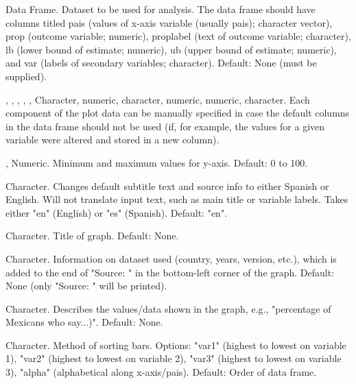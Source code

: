 \documentclass[a4paper]{book}
\begin{document}
\begin{Arguments}
\begin{ldescription}
\item[\code{data}] Data Frame. Dataset to be used for analysis.  The data frame should have columns
titled pais (values of x-axis variable (usually pais); character vector), prop (outcome variable; numeric),
proplabel (text of outcome variable; character), lb (lower bound of estimate; numeric),
ub (upper bound of estimate; numeric), and var (labels of secondary variables; character).
Default: None (must be supplied).

\item[\code{pais}, \code{outcome\_var}, \code{label\_var}, \code{lower\_bound}, \code{upper\_bound}, \code{var}] Character, numeric, character,
numeric, numeric, character. Each component of the plot data can be manually specified in case
the default columns in the data frame should not be used (if, for example, the values for a given
variable were altered and stored in a new column).

\item[\code{ymin}, \code{ymax}] Numeric.  Minimum and maximum values for y-axis. Default: 0 to 100.

\item[\code{lang}] Character.  Changes default subtitle text and source info to either Spanish or English.
Will not translate input text, such as main title or variable labels.  Takes either "en" (English)
or "es" (Spanish).  Default: "en".

\item[\code{main\_title}] Character.  Title of graph.  Default: None.

\item[\code{source\_info}] Character.  Information on dataset used (country, years, version, etc.),
which is added to the end of "Source: " in the bottom-left corner of the graph.
Default: None (only "Source: " will be printed).

\item[\code{subtitle}] Character.  Describes the values/data shown in the graph, e.g., "percentage of Mexicans who say...)".
Default: None.

\item[\code{sort}] Character. Method of sorting bars.  Options: "var1" (highest to lowest on variable 1),
"var2" (highest to lowest on variable 2), "var3" (highest to lowest on variable 3),
"alpha" (alphabetical along x-axis/pais). Default: Order of data frame.


\end{ldescription}
\end{Arguments}
\end{document}
